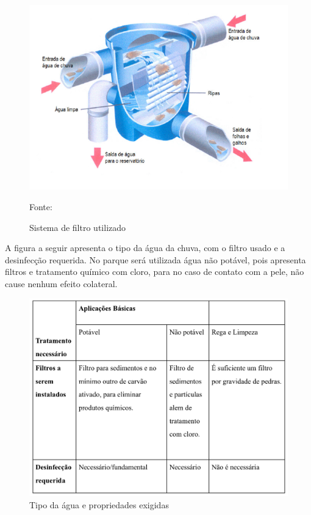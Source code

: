 \begin{figure}[h!]
	\centering
	\label{SistemaDeFiltroUtilizado}
		\includegraphics[keepaspectratio=true,scale=0.8]{figuras/SistemaDeFiltroUtilizado.png}
	\caption{Sistema de filtro utilizado}
	\small{Fonte:  \cite{TECHINIK}}
\end{figure}
 
 A figura a seguir apresenta o tipo da \'agua da chuva, com o filtro usado e a desinfec\c{c}\~ao requerida. No parque ser\'a utilizada \'agua n\~ao pot\'avel, pois apresenta filtros e tratamento qu\'imico com cloro, para no caso de contato com a pele, n\~ao cause nenhum efeito colateral.
 
\begin{figure}[h!]
	\centering
	\label{TipoAguaPropriedadesExigidas}
		\includegraphics[keepaspectratio=true,scale=0.8]{figuras/TipoAguaPropriedadesExigidas.png}
	\caption{Tipo da \'agua e propriedades exigidas}
\end{figure}
 
